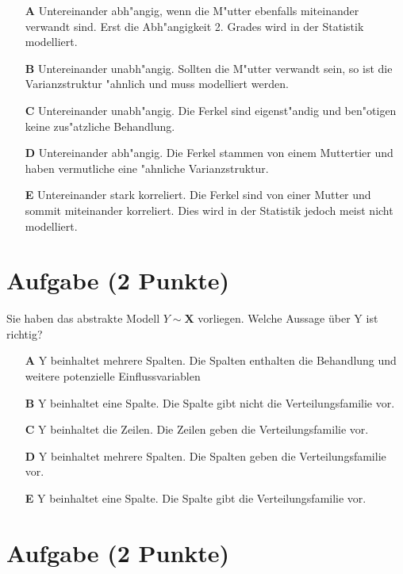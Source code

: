 \documentclass[a4paper, 10pt]{scrartcl}\usepackage[]{graphicx}\usepackage[]{xcolor}
\begin{document}
\begin{enumerate}
\item [\textbf{A} \msquare] Untereinander abh{"a}ngig, wenn die M{"u}tter ebenfalls miteinander verwandt sind. Erst die Abh{"a}ngigkeit 2. Grades wird in der Statistik modelliert.
\item [\textbf{B} \msquare] Untereinander unabh{"a}ngig. Sollten die M{"u}tter verwandt sein, so ist die Varianzstruktur {"a}hnlich und muss modelliert werden.
\item [\textbf{C} \msquare] Untereinander unabh{"a}ngig. Die Ferkel sind eigenst{"a}ndig und ben{"o}tigen keine zus{"a}tzliche Behandlung.
\item [\textbf{D} \msquare] Untereinander abh{"a}ngig. Die Ferkel stammen von einem Muttertier und haben vermutliche eine {"a}hnliche Varianzstruktur.
\item [\textbf{E} \msquare] Untereinander stark korreliert. Die Ferkel sind von einer Mutter und sommit miteinander korreliert. Dies wird in der Statistik jedoch meist nicht modelliert.
\end{enumerate}

\section{Aufgabe \hfill (2 Punkte)}




Sie haben das abstrakte Modell $Y \sim \mathbf{X}$ vorliegen. Welche Aussage {\"u}ber
Y ist richtig?



\begin{enumerate}
\item [\textbf{A} \msquare] Y beinhaltet mehrere Spalten. Die Spalten enthalten die Behandlung und weitere potenzielle Einflussvariablen
\item [\textbf{B} \msquare] Y beinhaltet eine Spalte. Die Spalte gibt nicht die Verteilungsfamilie vor.
\item [\textbf{C} \msquare] Y beinhaltet die Zeilen. Die Zeilen geben die Verteilungsfamilie vor.
\item [\textbf{D} \msquare] Y beinhaltet mehrere Spalten. Die Spalten geben die Verteilungsfamilie vor.
\item [\textbf{E} \msquare] Y beinhaltet eine Spalte. Die Spalte gibt die Verteilungsfamilie vor.
\end{enumerate}

\section{Aufgabe \hfill (2 Punkte)}
\end{document}
